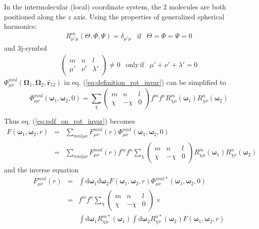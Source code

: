 In the intermolecular (local) coordinate system, the 2 molecules are
both positioned along the $z$ axis. Using the properties \citep{Edmonds,Gray-Gubbins,Messiah}
of generalized spherical harmonics:
\begin{equation}
\begin{array}{ccc}
R_{\mu'\mu}^{m}(\Theta,\Phi,\Psi)=\delta_{\mu'\mu} & \mathrm{if} & \Theta=\Phi=\Psi=0\end{array}
\end{equation}
and 3j-symbol
\begin{eqnarray}
\left(\begin{array}{ccc}
m & n & l\\
\mu' & \nu' & \lambda'
\end{array}\right)\neq0 & \mathrm{only\,if} & \mu'+\nu'+\lambda'=0
\end{eqnarray}
 $\Phi_{\mu\nu}^{mnl}(\mathbf{\Omega}_{1},\mathbf{\Omega}_{2},\mathbf{\hat{r}}_{12})$
in eq. (\ref{eq:definition_rot_invar}) can be simplified to
\begin{equation}
\Phi_{\mu\nu}^{mnl}(\boldsymbol{\omega}_{1},\boldsymbol{\omega}_{2},0)=\sum_{\chi}\left(\begin{array}{ccc}
m & n & l\\
\chi & -\chi & 0
\end{array}\right)f^{m}f^{n}R_{\chi\mu}^{m}(\boldsymbol{\omega}_{1})R_{\underline{\chi}\nu}^{n}(\boldsymbol{\omega}_{2})\label{eq:phi_local}
\end{equation}

Thus eq. (\ref{eq:pdf_on_rot_invar}) becomes
\begin{eqnarray}
F(\boldsymbol{\omega}_{1},\boldsymbol{\omega}_{2},r) & = & \sum_{mnl\mu\nu}F_{\mu\nu}^{mnl}(r)\Phi_{\mu\nu}^{mnl}(\boldsymbol{\omega}_{1},\boldsymbol{\omega}_{2},0)\nonumber \\
 & = & \sum_{mnl\mu\nu}F_{\mu\nu}^{mnl}(r)f^{m}f^{n}\sum_{\chi}\left(\begin{array}{ccc}
m & n & l\\
\chi & -\chi & 0
\end{array}\right)R_{\chi\mu}^{m}(\boldsymbol{\omega}_{1})R_{\underline{\chi}\nu}^{n}(\boldsymbol{\omega}_{2})\label{eq:eq_total_local}
\end{eqnarray}
and the inverse equation
\begin{eqnarray}
F_{\mu\nu}^{mnl}(r) & = & \int\mathrm{d}\boldsymbol{\omega}_{1}\mathrm{d}\boldsymbol{\omega}_{2}F(\boldsymbol{\omega}_{1},\boldsymbol{\omega}_{2},r)\Phi_{\mu\nu}^{mnl*}(\boldsymbol{\omega}_{1},\boldsymbol{\omega}_{2},0)\nonumber \\
 & = & f^{m}f^{n}\sum_{\chi}\left(\begin{array}{ccc}
m & n & l\\
\chi & -\chi & 0
\end{array}\right)\times\nonumber \\
 &  & \int\mathrm{d}\boldsymbol{\omega}_{1}R_{\chi\mu}^{m*}(\boldsymbol{\omega}_{1})\int\mathrm{d}\boldsymbol{\omega}_{2}R_{\underline{\chi}\nu}^{n*}(\boldsymbol{\omega}_{2})F(\boldsymbol{\omega}_{1},\boldsymbol{\omega}_{2},r)
\end{eqnarray}

